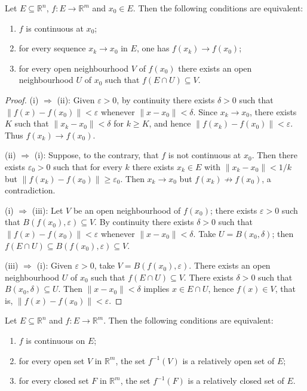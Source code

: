 \begin{proposition}\label{prop:continuity_equivalent}
Let $E \subseteq \mathbb{R}^n$, $f: E \to \mathbb{R}^m$ and $x_0 \in E$. Then the following conditions are equivalent:
\begin{enumerate}[label=(\roman*)]
    \item $f$ is continuous at $x_0$;
    \item for every sequence $x_k \to x_0$ in $E$, one has $f(x_k) \to f(x_0)$;
    \item for every open neighbourhood $V$ of $f(x_0)$ there exists an open neighbourhood $U$ of $x_0$ such that $f(E \cap U) \subseteq V$.
\end{enumerate}
\end{proposition}

\begin{proof}
(i) $\Rightarrow$ (ii): Given $\varepsilon > 0$, by continuity there exists $\delta > 0$ such that $\|f(x) - f(x_0)\| < \varepsilon$ whenever $\|x - x_0\| < \delta$. Since $x_k \to x_0$, there exists $K$ such that $\|x_k - x_0\| < \delta$ for $k \ge K$, and hence $\|f(x_k) - f(x_0)\| < \varepsilon$. Thus $f(x_k) \to f(x_0)$.

(ii) $\Rightarrow$ (i): Suppose, to the contrary, that $f$ is not continuous at $x_0$. Then there exists $\varepsilon_0 > 0$ such that for every $k$ there exists $x_k \in E$ with $\|x_k - x_0\| < 1/k$ but $\|f(x_k) - f(x_0)\| \ge \varepsilon_0$. Then $x_k \to x_0$ but $f(x_k) \not\to f(x_0)$, a contradiction.

(i) $\Rightarrow$ (iii): Let $V$ be an open neighbourhood of $f(x_0)$; there exists $\varepsilon > 0$ such that $B(f(x_0), \varepsilon) \subseteq V$. By continuity there exists $\delta > 0$ such that $\|f(x) - f(x_0)\| < \varepsilon$ whenever $\|x - x_0\| < \delta$. Take $U = B(x_0, \delta)$; then $f(E \cap U) \subseteq B(f(x_0), \varepsilon) \subseteq V$.

(iii) $\Rightarrow$ (i): Given $\varepsilon > 0$, take $V = B(f(x_0), \varepsilon)$. There exists an open neighbourhood $U$ of $x_0$ such that $f(E \cap U) \subseteq V$. There exists $\delta > 0$ such that $B(x_0, \delta) \subseteq U$. Then $\|x - x_0\| < \delta$ implies $x \in E \cap U$, hence $f(x) \in V$, that is, $\|f(x) - f(x_0)\| < \varepsilon$.
\end{proof}

\begin{theorem}\label{thm:continuity_global}
Let $E \subseteq \mathbb{R}^n$ and $f: E \to \mathbb{R}^m$. Then the following conditions are equivalent:
\begin{enumerate}[label=(\roman*)]
    \item $f$ is continuous on $E$;
    \item for every open set $V$ in $\mathbb{R}^m$, the set $f^{-1}(V)$ is a relatively open set of $E$;
    \item for every closed set $F$ in $\mathbb{R}^m$, the set $f^{-1}(F)$ is a relatively closed set of $E$.
\end{enumerate}
\end{theorem}

